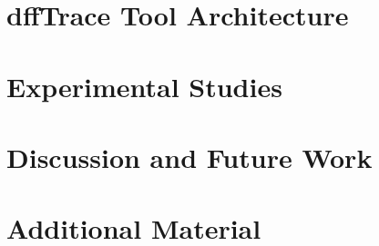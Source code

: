 \documentclass[conference]{IEEEtran}
\begin{document}

\section{dffTrace Tool Architecture}
\label{sec:components}



\section{Experimental Studies}
\label{sec:experimental}




    
\section{Discussion and Future Work}
\label{sec:discussion}







\clearpage

\appendix
\section{Additional Material}

\end{document}
